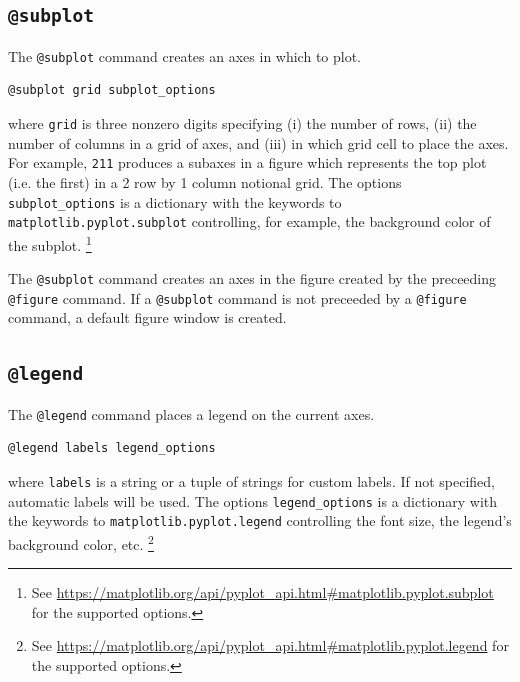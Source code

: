 \documentclass[11pt]{article}
\begin{document}
\subsection{\texttt{@subplot}}
\label{sec:subplot}
The \verb|@subplot| command creates an axes in which to plot.
\begin{lstlisting}[caption={Syntax for \texttt{@subplot}}, label=lst:subplot_syntax]
@subplot grid subplot_options
\end{lstlisting}
where \verb|grid| is three nonzero digits specifying (i) the number of rows, (ii) the number of columns in a grid of axes, and (iii) in which grid cell to place the axes. For example, \verb|211| produces a subaxes in a figure which represents the top plot (i.e. the first) in a 2 row by 1 column notional grid.
The options \verb|subplot_options| is a dictionary with the keywords to \texttt{matplotlib.pyplot.subplot} controlling, for example, the background color of the subplot.%
\footnote{See \url{https://matplotlib.org/api/pyplot_api.html#matplotlib.pyplot.subplot} for the supported options.}

The \verb|@subplot| command  creates an axes in the figure created by the preceeding \verb|@figure| command. 
If a \verb|@subplot| command is not preceeded by a \verb|@figure| command, a default figure window is created.

\subsection{\texttt{@legend}}
The \verb|@legend| command places a legend on the current axes.
\begin{lstlisting}[caption={Syntax for \texttt{@legend}}, label=lst:legend_syntax]
@legend labels legend_options
\end{lstlisting}
where \verb|labels| is a string or a tuple of strings for custom labels. If not specified, automatic labels will be used. The options \verb|legend_options| is a dictionary with the keywords to \texttt{matplotlib.pyplot.legend} controlling the font size, the legend's background color, etc.%
\footnote{See \url{https://matplotlib.org/api/pyplot_api.html#matplotlib.pyplot.legend} for the supported options.}
\end{document}
